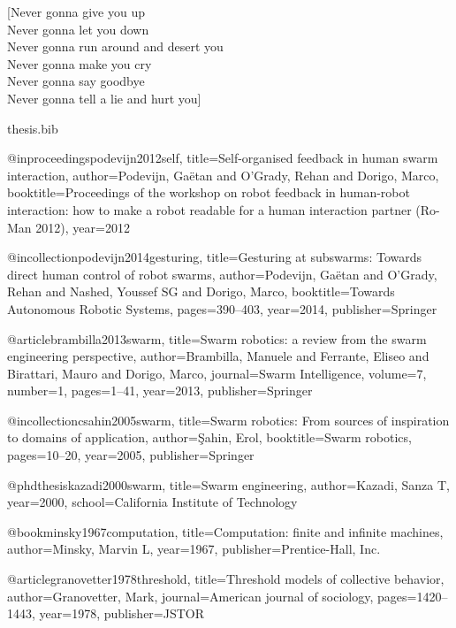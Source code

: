 \documentclass[a4paper, 12pt]{report}
\begin{document}
[Never gonna give you up\\
Never gonna let you down\\
Never gonna run around and desert you\\
Never gonna make you cry\\
Never gonna say goodbye\\
Never gonna tell a lie and hurt you]

\newpage


\begin{filecontents}{thesis.bib}

@inproceedings{podevijn2012self,
  title={Self-organised feedback in human swarm interaction},
  author={Podevijn, Ga{\"e}tan and O’Grady, Rehan and Dorigo, Marco},
  booktitle={Proceedings of the workshop on robot feedback in human-robot interaction: how to make a robot readable for a human interaction partner (Ro-Man 2012)},
  year={2012}
}

@incollection{podevijn2014gesturing,
  title={Gesturing at subswarms: Towards direct human control of robot swarms},
  author={Podevijn, Ga{\"e}tan and O’Grady, Rehan and Nashed, Youssef SG and Dorigo, Marco},
  booktitle={Towards Autonomous Robotic Systems},
  pages={390--403},
  year={2014},
  publisher={Springer}
}

@article{brambilla2013swarm,
  title={Swarm robotics: a review from the swarm engineering perspective},
  author={Brambilla, Manuele and Ferrante, Eliseo and Birattari, Mauro and Dorigo, Marco},
  journal={Swarm Intelligence},
  volume={7},
  number={1},
  pages={1--41},
  year={2013},
  publisher={Springer}
}

@incollection{csahin2005swarm,
  title={Swarm robotics: From sources of inspiration to domains of application},
  author={{\c{S}}ahin, Erol},
  booktitle={Swarm robotics},
  pages={10--20},
  year={2005},
  publisher={Springer}
}

@phdthesis{kazadi2000swarm,
  title={Swarm engineering},
  author={Kazadi, Sanza T},
  year={2000},
  school={California Institute of Technology}
}

@book{minsky1967computation,
  title={Computation: finite and infinite machines},
  author={Minsky, Marvin L},
  year={1967},
  publisher={Prentice-Hall, Inc.}
}

@article{granovetter1978threshold,
  title={Threshold models of collective behavior},
  author={Granovetter, Mark},
  journal={American journal of sociology},
  pages={1420--1443},
  year={1978},
  publisher={JSTOR}
}


\end{filecontents}
\end{document}
